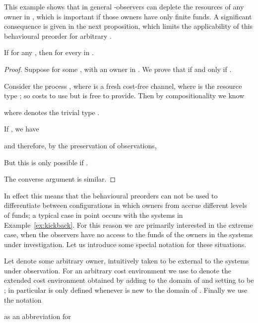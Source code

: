 \documentclass{LMCS}
\begin{document}
This example shows that in general -observers  can deplete the resources of any owner
in , which is important if those owners have only finite funds. A significant  consequence 
is given in the next proposition, which limits the applicability of this behavioural preorder for
arbitrary . 
\begin{prop}\label{prop:increase}
  If  for any , then
      for every  in . 
\end{prop}
\begin{proof}
  Suppose   for
  some , with  an owner in .   We prove that  
if and only if  .

  Consider the process , where  is a fresh cost-free channel, where
   is the resource type ; so  costs  to use but
  is free to provide.  Then by compositionality we know

where  denotes the trivial type . 

If   , we have 

and therefore, by the preservation of observations, 

But this is only possible if . 

The converse argument is similar. 
\end{proof}
In effect this means that the behavioural preorders 
can not be used to differentiate between configurations in which
owners from  accrue different levels of funds; a typical case
in point occurs with the systems in Example~\ref{ex:kickback}. For this
reason we are primarily interested in the extreme case, when the observers 
have no access to the funds of the owners in the systems under investigation. 
Let us introduce some special notation for these
situations.

Let  denote some arbitrary owner, intuitively taken to be external to the 
systems under observation.
For an arbitrary cost environment  we use  to denote the 
extended cost environment obtained by adding  to the domain of  
and setting  to be ; in particular  is only defined
whenever  is new to the domain of .   Finally we use the notation

as an abbreviation for
\end{document}
